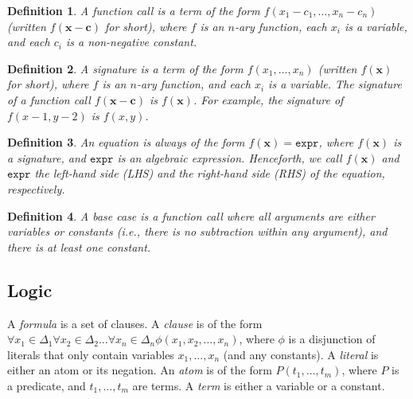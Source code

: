 \documentclass{article}
\newtheorem{definition}{Definition}
\newcommand{\expr}{\mathtt{expr}}
\begin{document}
\begin{definition}
  A \emph{function call} is a term of the form
  $f(x_{1} - c_{1}, \dots, x_{n} - c_{n})$ (written $f(\mathbf{x} - \mathbf{c})$
  for short), where $f$ is an $n$-ary function, each $x_{i}$ is a variable, and
  each $c_{i}$ is a non-negative constant.
\end{definition}

\begin{definition}
  A \emph{signature} is a term of the form $f(x_{1}, \dots, x_{n})$ (written
  $f(\mathbf{x})$ for short), where $f$ is an $n$-ary function, and each $x_{i}$
  is a variable. The signature of a function call $f(\mathbf{x} - \mathbf{c})$
  is $f(\mathbf{x})$. For example, the signature of $f(x - 1, y - 2)$ is
  $f(x, y)$.
\end{definition}

\begin{definition}
  An \emph{equation} is always of the form $f(\mathbf{x}) = \expr{}$, where
  $f(\mathbf{x})$ is a signature, and $\expr{}$ is an algebraic expression.
  Henceforth, we call $f(\mathbf{x})$ and $\expr{}$ the left-hand side (LHS) and
  the right-hand side (RHS) of the equation, respectively.
\end{definition}

\begin{definition}
  A \emph{base case} is a function call where all arguments are either variables
  or constants (i.e., there is no subtraction within any argument), and there is
  at least one constant.
\end{definition}

\subsection{Logic}



A \emph{formula} is a set of clauses. A \emph{clause} is of the form
$\forall x_{1} \in \Delta_{1}\forall x_{2} \in \Delta_{2}\dots\forall x_{n} \in \Delta_{n} \phi(x_{1}, x_{2}, \dots, x_{n})$,
where $\phi$ is a disjunction of literals that only contain variables
$x_{1}, \dots, x_{n}$ (and any constants). A \emph{literal} is either an atom or
its negation. An \emph{atom} is of the form $P(t_{1}, \dots, t_{m})$, where $P$
is a predicate, and $t_{1}, \dots, t_{m}$ are terms. A \emph{term} is either a
variable or a constant.
\end{document}
